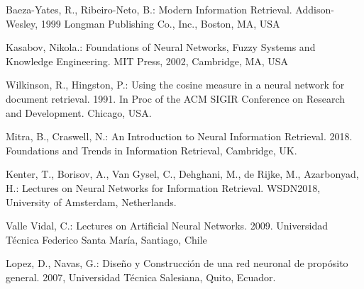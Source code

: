 \documentclass{llncs}
\begin{document}
\begin{thebibliography}{1}

Baeza-Yates, R., Ribeiro-Neto, B.:
Modern Information Retrieval.
Addison-Wesley, 1999
Longman Publishing Co., Inc., Boston, MA, USA

Kasabov, Nikola.:
Foundations of Neural Networks, Fuzzy Systems and Knowledge Engineering.
MIT Press, 2002, Cambridge, MA, USA

Wilkinson, R., Hingston, P.:
Using the cosine measure in a neural network for document retrieval. 1991.
In Proc of the ACM SIGIR Conference on Research and Development. Chicago, USA.

Mitra, B., Craswell, N.:
An Introduction to Neural Information Retrieval. 2018.
Foundations and Trends in Information Retrieval, Cambridge, UK.

Kenter, T., Borisov, A., Van Gysel, C., Dehghani, M., de Rijke, M., Azarbonyad, H.:
Lectures on Neural Networks for Information Retrieval.
WSDN2018, University of Amsterdam, Netherlands.

Valle Vidal, C.:
Lectures on Artificial Neural Networks. 2009.
Universidad T\'ecnica Federico Santa Mar\'ia, Santiago, Chile

Lopez, D., Navas, G.:
Dise\~no y Construcci\'on de una red neuronal de prop\'osito general.
2007, Universidad T\'ecnica Salesiana, Quito, Ecuador.

\end{thebibliography}
\end{document}

